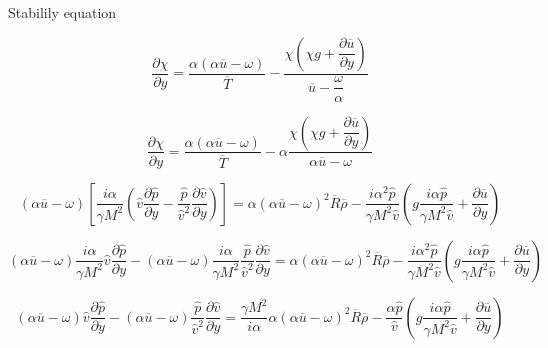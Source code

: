 Stabilily equation 

\begin{equation} 
        \frac{\partial \chi}{\partial y}
        =
        \frac{\alpha(\alpha\overline{u}-\omega)}{\overline{T}} 
        -
        \frac{\chi
        (\chi g+\dfrac{\partial \overline{u}}{\partial y})}{\overline{u}-\dfrac{\omega}{\alpha}}
\end{equation} 

\begin{equation*} 
        \frac{\partial \chi}{\partial y}
        =
        \frac{\alpha(\alpha\overline{u}-\omega)}{\overline{T}} 
        -
        \alpha\frac{\chi
        (\chi g+\dfrac{\partial \overline{u}}{\partial y})}{\alpha\overline{u}-\omega}
\end{equation*} 

\begin{equation*} 
        (\alpha\overline{u}-\omega)
        \left[
            \frac{i\alpha }{\gamma M^2 }
            \left(
                \hat{v}
                \frac{\partial \hat{p}}{\partial y}
                -
                \frac{\hat{p}}{\hat{v}^2}
                \frac{\partial \hat{v}}{\partial y}
            \right)
        \right]
        =
        \alpha(\alpha\overline{u}-\omega)^2
        \overline{R}
        \overline{\rho}
        -
        \frac{i\alpha^2 \hat{p}}{\gamma M^2 \hat{v}}
        \left(
            g\frac{i\alpha \hat{p}}{\gamma M^2 \hat{v}}
            +
            \frac{\partial \overline{u}}{\partial y}
        \right)
\end{equation*} 

\begin{equation*} 
        (\alpha\overline{u}-\omega)
        \frac{i\alpha }{\gamma M^2 }
        \hat{v}
        \frac{\partial \hat{p}}{\partial y}
        -
        (\alpha\overline{u}-\omega)
        \frac{i\alpha }{\gamma M^2 }
        \frac{\hat{p}}{\hat{v}^2}
        \frac{\partial \hat{v}}{\partial y}
        =
        \alpha(\alpha\overline{u}-\omega)^2
        \overline{R}
        \overline{\rho}
        -
        \frac{i\alpha^2 \hat{p}}{\gamma M^2 \hat{v}}
        \left(
            g\frac{i\alpha \hat{p}}{\gamma M^2 \hat{v}}
            +
            \frac{\partial \overline{u}}{\partial y}
        \right)
\end{equation*}

\begin{equation*} 
        (\alpha\overline{u}-\omega)
        \hat{v}
        \frac{\partial \hat{p}}{\partial y}
        -
        (\alpha\overline{u}-\omega)
        \frac{\hat{p}}{\hat{v}^2}
        \frac{\partial \hat{v}}{\partial y}
        =
        \frac{\gamma M^2 }{i\alpha }
        \alpha(\alpha\overline{u}-\omega)^2
        \overline{R}
        \overline{\rho}
        -
        \frac{\alpha \hat{p}}{ \hat{v}}
        \left(
            g\frac{i\alpha \hat{p}}{\gamma M^2 \hat{v}}
            +
            \frac{\partial \overline{u}}{\partial y}
        \right)
\end{equation*} 

